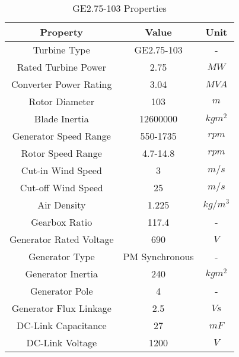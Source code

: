 \begin{table}[h]
	
	\centering
	\begin{tabular}{ccc}
		\hline
		\textbf{Property}       & \textbf{Value} & \textbf{Unit} \\ \hline
		Turbine Type            & GE2.75-103     & -             \\
		Rated Turbine Power     & 2.75           & $MW$          \\
		Converter Power Rating  & 3.04           & $MVA$         \\
		Rotor Diameter          & 103            & $m$           \\
		Blade Inertia           & 12600000       & $kgm^{2}$     \\
		Generator Speed Range   & 550-1735       & $rpm$         \\
		Rotor Speed Range       & 4.7-14.8       & $rpm$         \\
		Cut-in Wind Speed       & 3              & $m/s$         \\
		Cut-off Wind Speed      & 25             & $m/s$         \\
		Air Density             & 1.225          & $kg/m^{3}$    \\
		Gearbox Ratio           & 117.4          & -             \\
		Generator Rated Voltage & 690            & $V$           \\
		Generator Type          & PM Synchronous & -             \\
		Generator Inertia       & 240            & $kgm^{2}$     \\
		Generator Pole          & 4              & -             \\
		Generator Flux Linkage  & 2.5            & $Vs$          \\
		DC-Link Capacitance     & 27             & $mF$          \\
		DC-Link Voltage         & 1200           & $V$           \\ \hline
	\end{tabular}
	\caption{GE2.75-103 Properties}
	\label{ge275}
\end{table}
